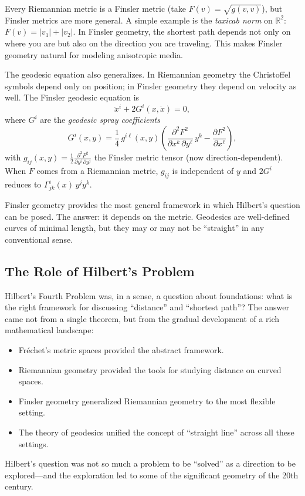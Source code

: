 Every Riemannian metric is a Finsler metric (take $F(v) = \sqrt{g(v,v)}$), but Finsler metrics are more general. A simple example is the \emph{taxicab norm} on $\mathbb{R}^2$: $F(v) = |v_1| + |v_2|$. In Finsler geometry, the shortest path depends not only on where you are but also on the direction you are traveling. This makes Finsler geometry natural for modeling anisotropic media.

The geodesic equation also generalizes. In Riemannian geometry the Christoffel symbols depend only on position; in Finsler geometry they depend on velocity as well. The Finsler geodesic equation is
\[
\ddot{x}^i + 2 G^i(x,\dot{x}) = 0,
\]
where $G^i$ are the \emph{geodesic spray coefficients}
\[
G^i(x,y) = \frac{1}{4}\, g^{i\ell}(x,y)\left(
\frac{\partial^2 F^2}{\partial x^k\,\partial y^\ell}\,y^k - \frac{\partial F^2}{\partial x^\ell}
\right),
\]
with $g_{ij}(x,y) = \frac12\frac{\partial^2 F^2}{\partial y^i\,\partial y^j}$ the Finsler metric tensor (now direction-dependent). When $F$ comes from a Riemannian metric, $g_{ij}$ is independent of $y$ and $2G^i$ reduces to $\Gamma^i_{jk}(x)\,y^j y^k$.

Finsler geometry provides the most general framework in which Hilbert's question can be posed. The answer: it depends on the metric. Geodesics are well-defined curves of minimal length, but they may or may not be ``straight'' in any conventional sense.

\subsection{The Role of Hilbert's Problem}

Hilbert's Fourth Problem was, in a sense, a question about foundations: what is the right framework for discussing ``distance'' and ``shortest path''? The answer came not from a single theorem, but from the gradual development of a rich mathematical landscape:
\begin{itemize}
    \item Fr\'echet's metric spaces provided the abstract framework.
    \item Riemannian geometry provided the tools for studying distance on curved spaces.
    \item Finsler geometry generalized Riemannian geometry to the most flexible setting.
    \item The theory of geodesics unified the concept of ``straight line'' across all these settings.
\end{itemize}
Hilbert's question was not so much a problem to be ``solved'' as a direction to be explored---and the exploration led to some of the significant geometry of the 20th century.

